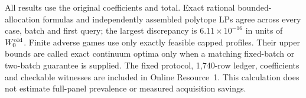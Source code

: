 All results use the original coefficients and total. Exact rational
bounded-allocation formulas and independently assembled polytope LPs
agree across every case, batch and first query; the largest discrepancy
is $6.11\times10^{-16}$ in units of $W_0^{\rm old}$.
Finite adverse games use only exactly feasible capped profiles.
Their upper bounds are called exact continuum optima only when a
matching fixed-batch or two-batch guarantee is supplied.
The fixed protocol, 1,740-row ledger, coefficients and checkable witnesses
are included in Online Resource~1. This calculation does not estimate
full-panel prevalence or measured acquisition savings.
